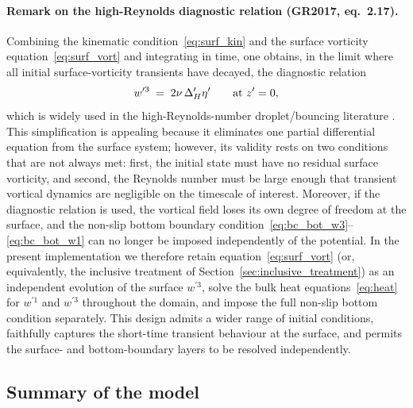 \documentclass{article}
\begin{document}
\paragraph{Remark on the high-Reynolds diagnostic relation (GR2017, eq.~2.17).}
Combining the kinematic condition~\eqref{eq:surf_kin} and the surface vorticity equation~\eqref{eq:surf_vort} and integrating in time, one obtains, in the limit where all initial surface-vorticity transients have decayed, the diagnostic relation
\begin{equation}
    w^{\prime 3} \;=\; 2\nu\, \Delta_H' \eta' \qquad \text{at } z' = 0,
    \label{eq:w3_diagnostic_remark}
\color{black}
\end{equation}
which is widely used in the high-Reynolds-number droplet/bouncing literature \citep{GaleanoRiosEtAl2017}.
\color{blue}
This simplification is appealing because it eliminates one partial differential equation from the surface system; however, its validity rests on two conditions that are not always met: first, the initial state must have no residual surface vorticity, and second, the Reynolds number must be large enough that transient vortical dynamics are negligible on the timescale of interest.
Moreover, if the diagnostic relation is used, the vortical field loses its own degree of freedom at the surface, and the non-slip bottom boundary condition~\eqref{eq:bc_bot_w3}--\eqref{eq:bc_bot_w1} can no longer be imposed independently of the potential.
In the present implementation we therefore retain equation~\eqref{eq:surf_vort} (or, equivalently, the inclusive treatment of Section~\ref{sec:inclusive_treatment}) as an independent evolution of the surface $w^{\prime 3}$, solve the bulk heat equations~\eqref{eq:heat} for $w^{\prime 1}$ and $w^{\prime 3}$ throughout the domain, and impose the full non-slip bottom condition separately.
This design admits a wider range of initial conditions, faithfully captures the short-time transient behaviour at the surface, and permits the surface- and bottom-boundary layers to be resolved independently.

\color{black}
\subsection{Summary of the model}
\label{sec:model_summary}
\end{document}
